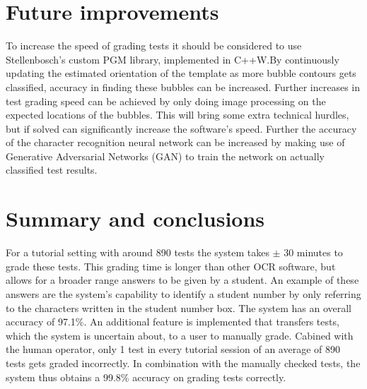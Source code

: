 \section{Future improvements}

To increase the speed of grading tests it should be considered to use Stellenbosch's custom PGM library, implemented in C++W.By continuously updating the estimated orientation of the template as more bubble contours gets classified, accuracy in finding these bubbles can be increased. Further increases in test grading speed can be achieved by only doing image processing on the expected locations of the bubbles. This will bring some extra technical hurdles, but if solved can significantly increase the software's speed. Further the accuracy of the character recognition neural network can be increased by making use of Generative Adversarial Networks (GAN) to train the network on actually classified test results.

\section{Summary and conclusions}

For a tutorial setting with around 890 tests the system takes $\pm$ 30 minutes to grade these tests. This grading time is longer than other OCR software, but allows for a broader range answers to be given by a student. An example of these answers are the system's capability to identify a student number by only referring to the characters written in the student number box. The system has an overall accuracy of 97.1\%. An additional feature is implemented that transfers tests, which the system is uncertain about, to a user to manually grade. Cabined with the human operator, only 1 test in every tutorial session of an average of 890 tests gets graded incorrectly. In combination with the manually checked tests, the system thus obtains a 99.8\% accuracy on grading tests correctly. 
